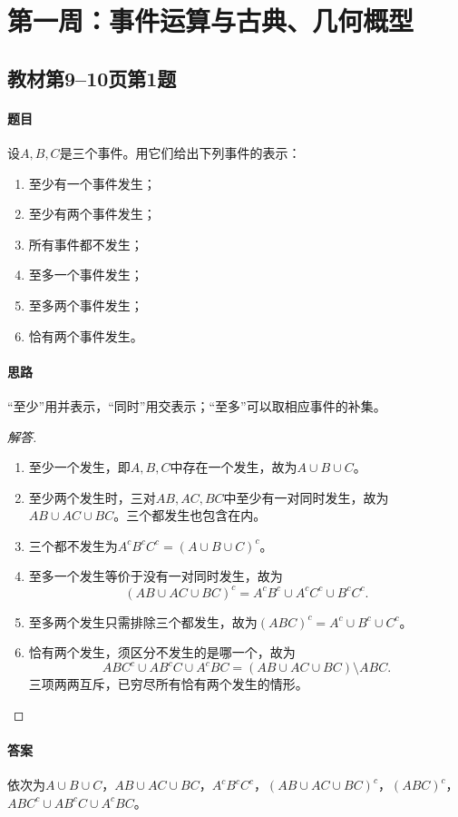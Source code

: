 \clearpage\section{第一周：事件运算与古典、几何概型}
\subsection{教材第9--10页第1题}\label{ex:w01-t1}
\paragraph{题目}
设$A,B,C$是三个事件。用它们给出下列事件的表示：
\begin{enumerate}[label=(\arabic*)]
\item 至少有一个事件发生；\item 至少有两个事件发生；\item 所有事件都不发生；\item 至多一个事件发生；\item 至多两个事件发生；\item 恰有两个事件发生。
\end{enumerate}
\paragraph{思路}“至少”用并表示，“同时”用交表示；“至多”可以取相应事件的补集。
\begin{proof}[解答]
\begin{enumerate}[label=(\arabic*)]
\item 至少一个发生，即$A,B,C$中存在一个发生，故为$A\cup B\cup C$。
\item 至少两个发生时，三对$AB,AC,BC$中至少有一对同时发生，故为$AB\cup AC\cup BC$。三个都发生也包含在内。
\item 三个都不发生为$A^cB^cC^c=(A\cup B\cup C)^c$。
\item 至多一个发生等价于没有一对同时发生，故为
\[(AB\cup AC\cup BC)^c=A^cB^c\cup A^cC^c\cup B^cC^c.\]
\item 至多两个发生只需排除三个都发生，故为$(ABC)^c=A^c\cup B^c\cup C^c$。
\item 恰有两个发生，须区分不发生的是哪一个，故为
\[ABC^c\cup AB^cC\cup A^cBC=(AB\cup AC\cup BC)\setminus ABC.\]
三项两两互斥，已穷尽所有恰有两个发生的情形。
\end{enumerate}
\end{proof}
\paragraph{答案}依次为$A\cup B\cup C$，$AB\cup AC\cup BC$，$A^cB^cC^c$，$(AB\cup AC\cup BC)^c$，$(ABC)^c$，$ABC^c\cup AB^cC\cup A^cBC$。

